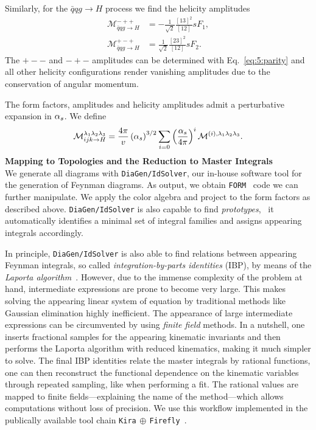 Similarly, for the $\bar{q}q g \rightarrow H$ process we find the helicity amplitudes
\begin{equation}
\begin{split}
\mathcal{M}^{-++}_{\bar{q}q g \rightarrow H} &= - \frac{1}{\sqrt{2}} \frac{[13]^2}{[12]} s F_1, \\
\mathcal{M}^{+-+}_{\bar{q}q g \rightarrow H} &= \frac{1}{\sqrt{2}} \frac{[23]^2}{[12]} s F_2.
\end{split}
\end{equation}
The $+--$ and $-+-$ amplitudes can be determined with Eq.~\eqref{eq:5:parity} and all other helicity configurations render vanishing amplitudes due to the conservation of angular momentum.

The form factors, amplitudes and helicity amplitudes admit a perturbative expansion in $\alpha_s$. We define
\begin{equation}
\mathcal{M}^{\lambda_1\lambda_2 \lambda_3}_{ijk \rightarrow H} = \frac{4 \pi}{v}  \left(\alpha_s\right)^{3/2} \sum_{i = 0} \left(\frac{\alpha_s}{4 \pi} \right)^i \mathcal{M}^{(i),\lambda_1 \lambda_2 \lambda_3}.
\end{equation}
\textbf{Mapping to Topologies and the Reduction to Master Integrals} \\
We generate all diagrams with \texttt{DiaGen/IdSolver}, our in-house software tool for the generation of Feynman diagrams. As output, we obtain \texttt{FORM}~\cite{Vermaseren:2000nd, Ruijl:2017dtg} code we can further manipulate. We apply the color algebra and project to the form factors as described above. \texttt{DiaGen/IdSolver} is also capable to find \textit{prototypes}, \ie\ it automatically identifies a minimal set of integral families and assigns appearing integrals accordingly.

In principle, \texttt{DiaGen/IdSolver} is also able to find relations between appearing Feynman integrals, so called \textit{integration-by-parts identities} (\acs{IBP}), by means of the \textit{Laporta algorithm}~\cite{Laporta:2000dsw}. However, due to the immense complexity of the problem at hand, intermediate expressions are prone to become very large. This makes solving the appearing linear system of equation by traditional methods like Gaussian elimination highly inefficient. The appearance of large intermediate expressions can be circumvented by using \textit{finite field} methods. In a nutshell, one inserts fractional samples for the appearing kinematic invariants and then performs the Laporta algorithm with reduced kinematics, making it much simpler to solve. The final \acs{IBP} identities relate the master integrals by rational functions, one can then reconstruct the functional dependence on the kinematic variables through repeated sampling, like when performing a fit. The rational values are mapped to finite fields---explaining the name of the method---which allows computations without loss of precision. We use this workflow implemented in the publically available tool chain \texttt{Kira$\,\oplus\,$Firefly}~\cite{Maierhofer:2017gsa, Maierhofer:2018gpa, Klappert:2020nbg}.

